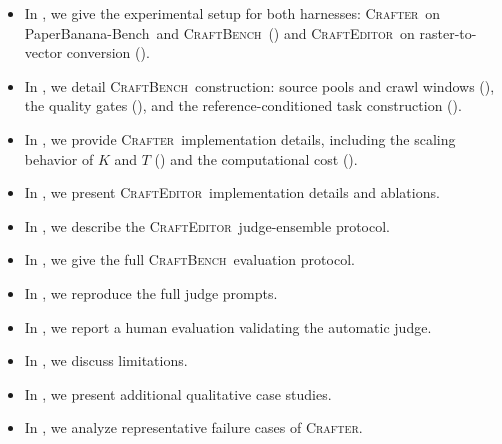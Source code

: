 \documentclass{llmxive}
\providecommand{\Crafter}{\textsc{Crafter}\xspace}
\providecommand{\Editor}{\textsc{CraftEditor}\xspace}
\providecommand{\CrafterBench}{\textsc{CraftBench}\xspace}
\providecommand{\PaperBananaBench}{PaperBanana-Bench\xspace}
\begin{document}
\begin{itemize}[leftmargin=1.4em,itemsep=2pt,topsep=2pt]
    \item In , we give the experimental setup for both harnesses: \Crafter\ on \PaperBananaBench\ and \CrafterBench\ () and \Editor\ on raster-to-vector conversion ().
    \item In , we detail \CrafterBench\ construction: source pools and crawl windows (), the quality gates (), and the reference-conditioned task construction ().
    \item In , we provide \Crafter\ implementation details, including the scaling behavior of $K$ and $T$ () and the computational cost ().
    \item In , we present \Editor\ implementation details and ablations.
    \item In , we describe the \Editor\ judge-ensemble protocol.
    \item In , we give the full \CrafterBench\ evaluation protocol.
    \item In , we reproduce the full judge prompts.
    \item In , we report a human evaluation validating the automatic judge.
    \item In , we discuss limitations.
    \item In , we present additional qualitative case studies.
    \item In , we analyze representative failure cases of \Crafter.
\end{itemize}

 
\end{document}
